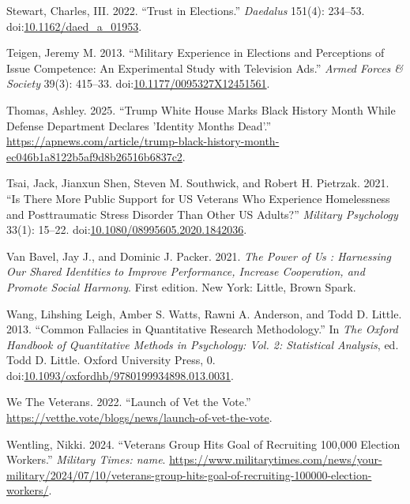 \documentclass[
  12pt,
  letterpaper,
]{article}
\newlength{\cslhangindent}
\newenvironment{CSLReferences}[2] %
 {\begin{list}{}{%
  \setlength{\itemindent}{0pt}
  \setlength{\leftmargin}{0pt}
  \setlength{\parsep}{0pt}
  \ifodd #1
   \setlength{\leftmargin}{\cslhangindent}
   \setlength{\itemindent}{-1\cslhangindent}
  \fi
  \setlength{\itemsep}{#2\baselineskip}}}
 {\end{list}}
\begin{document}
\begin{CSLReferences}{1}{1}
Stewart, Charles, III. 2022. {``Trust in {Elections}.''} \emph{Daedalus}
151(4): 234--53.
doi:\href{https://doi.org/10.1162/daed_a_01953}{10.1162/daed\_a\_01953}.

Teigen, Jeremy M. 2013. {``Military {Experience} in {Elections} and
{Perceptions} of {Issue Competence}: {An Experimental Study} with
{Television Ads}.''} \emph{Armed Forces \& Society} 39(3): 415--33.
doi:\href{https://doi.org/10.1177/0095327X12451561}{10.1177/0095327X12451561}.

Thomas, Ashley. 2025. {``Trump {White House} Marks {Black History Month}
While {Defense Department} Declares 'Identity Months Dead'.''}
\url{https://apnews.com/article/trump-black-history-month-ec046b1a8122b5af9d8b26516b6837c2}.

Tsai, Jack, Jianxun Shen, Steven M. Southwick, and Robert H. Pietrzak.
2021. {``Is There More Public Support for {US Veterans} Who Experience
Homelessness and Posttraumatic Stress Disorder Than Other {US}
Adults?''} \emph{Military Psychology} 33(1): 15--22.
doi:\href{https://doi.org/10.1080/08995605.2020.1842036}{10.1080/08995605.2020.1842036}.

Van Bavel, Jay J., and Dominic J. Packer. 2021. \emph{The Power of Us :
Harnessing Our Shared Identities to Improve Performance, Increase
Cooperation, and Promote Social Harmony}. First edition. New York:
Little, Brown Spark.

Wang, Lihshing Leigh, Amber S. Watts, Rawni A. Anderson, and Todd D.
Little. 2013. {``Common {Fallacies} in {Quantitative Research
Methodology}.''} In \emph{The {Oxford Handbook} of {Quantitative
Methods} in {Psychology}: {Vol}. 2: {Statistical Analysis}}, ed. Todd D.
Little. Oxford University Press, 0.
doi:\href{https://doi.org/10.1093/oxfordhb/9780199934898.013.0031}{10.1093/oxfordhb/9780199934898.013.0031}.

We The Veterans. 2022. {``Launch of {Vet} the {Vote}.''}
\url{https://vetthe.vote/blogs/news/launch-of-vet-the-vote}.

Wentling, Nikki. 2024. {``Veterans Group Hits Goal of Recruiting 100,000
Election Workers.''} \emph{Military Times: name}.
\url{https://www.militarytimes.com/news/your-military/2024/07/10/veterans-group-hits-goal-of-recruiting-100000-election-workers/}.


\end{CSLReferences}
\end{document}
